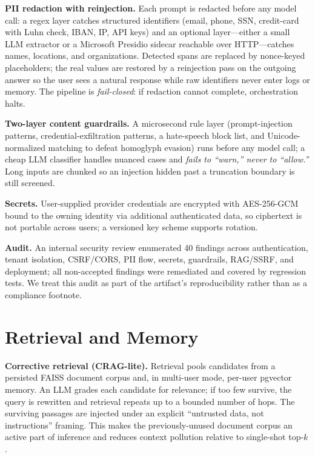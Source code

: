 \documentclass{article}
\begin{document}
\textbf{PII redaction with reinjection.} Each prompt is redacted before any model call: a
regex layer catches structured identifiers (email, phone, SSN, credit-card with Luhn check,
IBAN, IP, API keys) and an optional layer---either a small LLM extractor or a Microsoft
Presidio sidecar reachable over HTTP---catches names, locations, and organizations. Detected
spans are replaced by nonce-keyed placeholders; the real values are restored by a reinjection
pass on the outgoing answer so the user sees a natural response while raw identifiers never
enter logs or memory. The pipeline is \emph{fail-closed}: if redaction cannot complete,
orchestration halts.

\textbf{Two-layer content guardrails.} A microsecond rule layer (prompt-injection patterns,
credential-exfiltration patterns, a hate-speech block list, and Unicode-normalized matching
to defeat homoglyph evasion) runs before any model call; a cheap LLM classifier handles
nuanced cases and \emph{fails to ``warn,'' never to ``allow.''} Long inputs are chunked so an
injection hidden past a truncation boundary is still screened.

\textbf{Secrets.} User-supplied provider credentials are encrypted with AES-256-GCM bound to
the owning identity via additional authenticated data, so ciphertext is not portable across
users; a versioned key scheme supports rotation.

\textbf{Audit.} An internal security review enumerated 40 findings across authentication,
tenant isolation, CSRF/CORS, PII flow, secrets, guardrails, RAG/SSRF, and deployment; all
non-accepted findings were remediated and covered by regression tests. We treat this audit as
part of the artifact's reproducibility rather than as a compliance footnote.

\section{Retrieval and Memory}
\label{sec:retrieval}
\textbf{Corrective retrieval (CRAG-lite).} Retrieval pools candidates from a persisted FAISS
document corpus and, in multi-user mode, per-user pgvector memory. An LLM grades each
candidate for relevance; if too few survive, the query is rewritten and retrieval repeats up
to a bounded number of hops. The surviving passages are injected under an explicit
``untrusted data, not instructions'' framing. This makes the previously-unused document
corpus an active part of inference and reduces context pollution relative to single-shot
top-$k$.
\end{document}
